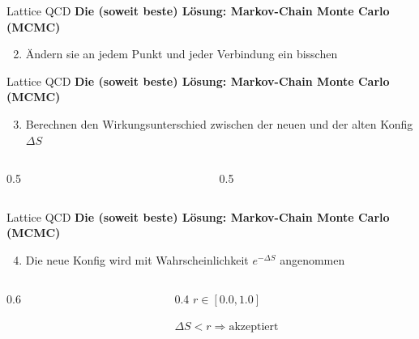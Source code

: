 \documentclass[
  ignorenonframetext,
  ngerman,
]{beamer}
\providecommand{\tightlist}{%
  \setlength{\itemsep}{0pt}\setlength{\parskip}{0pt}}
\begin{document}
\begin{frame}{Lattice QCD}
\label{lattice-qcd-4}
\textbf{Die (soweit beste) Lösung: Markov-Chain Monte Carlo (MCMC)}

\begin{enumerate}
\setcounter{enumi}{1}
\tightlist
\item
  Ändern sie an jedem Punkt und jeder Verbindung ein bisschen
\end{enumerate}
\end{frame}

\begin{frame}{Lattice QCD}
\label{lattice-qcd-5}
\textbf{Die (soweit beste) Lösung: Markov-Chain Monte Carlo (MCMC)}

\begin{enumerate}
\setcounter{enumi}{2}
\tightlist
\item
  Berechnen den Wirkungsunterschied zwischen der neuen und der alten
  Konfig \(\Delta S\)
\end{enumerate}

\begin{columns}[T]
\begin{column}{0.5\linewidth}
\end{column}

\begin{column}{0.5\linewidth}
\end{column}
\end{columns}
\end{frame}

\begin{frame}{Lattice QCD}
\label{lattice-qcd-6}
\textbf{Die (soweit beste) Lösung: Markov-Chain Monte Carlo (MCMC)}

\begin{enumerate}
\setcounter{enumi}{3}
\tightlist
\item
  Die neue Konfig wird mit Wahrscheinlichkeit \(e^{-\Delta S}\)
  angenommen
\end{enumerate}

\begin{columns}[T]
\begin{column}{0.6\linewidth}
\end{column}

\begin{column}{0.4\linewidth}
\(r \in [0.0, 1.0]\)

\(\Delta S < r \Rightarrow \textrm{akzeptiert}\)
\end{column}
\end{columns}
\end{frame}
\end{document}
